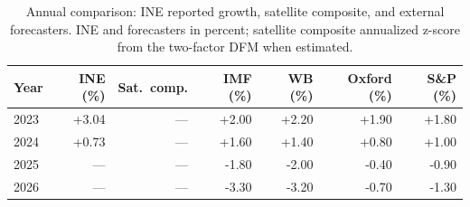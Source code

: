\begin{table}[H]
\centering\small
\caption{Annual comparison: INE reported growth, satellite composite, and external forecasters. INE and forecasters in percent; satellite composite annualized z-score from the two-factor DFM when estimated.}
\label{tab:sat_vs_ine}
\begin{tabular}{lrrrrrr}
\toprule
Year & INE (\%) & Sat.\ comp. & IMF (\%) & WB (\%) & Oxford (\%) & S\&P (\%) \\
\midrule
2023 & +3.04 & --- & +2.00 & +2.20 & +1.90 & +1.80 \\
2024 & +0.73 & --- & +1.60 & +1.40 & +0.80 & +1.00 \\
2025 & --- & --- & -1.80 & -2.00 & -0.40 & -0.90 \\
2026 & --- & --- & -3.30 & -3.20 & -0.70 & -1.30 \\
\bottomrule
\end{tabular}
\end{table}